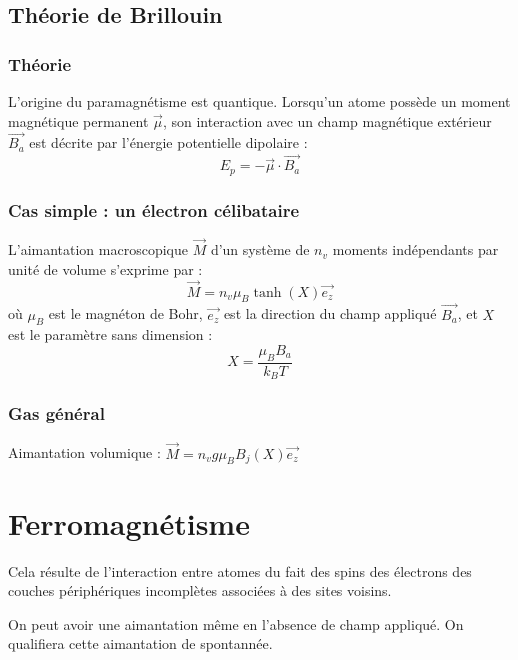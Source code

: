 \documentclass[french]{yLectureNote}
\renewcommand{\vec}{\overrightarrow}
\begin{document}
\subsection{Théorie de Brillouin}

\subsubsection{Théorie}

L'origine du paramagnétisme est quantique. Lorsqu'un atome possède un moment magnétique permanent $\vec{\mu}$, son interaction avec un champ magnétique extérieur $\vec{B_a}$ est décrite par l'énergie potentielle dipolaire :
$$E_p = -\vec{\mu} \cdot \vec{B_a}$$
\subsubsection{Cas simple : un électron célibataire}

\begin{proposition}
L'aimantation macroscopique $\vec{M}$ d'un système de $n_v$ moments indépendants par unité de volume s'exprime par :
$$\vec{M} = n_v \mu_B \tanh(X)\vec{e_z}$$
où $\mu_B$ est le magnéton de Bohr, $\vec{e_z}$ est la direction du champ appliqué $\vec{B_a}$, et $X$ est le paramètre sans dimension :
$$X = \frac{\mu_B B_a}{k_B T}$$
\end{proposition}


\subsubsection{Gas général}
\begin{definition}
    Aimantation volumique : $\vec{M} = n_v g\mu_B B_j(X)\vec{e_z}$

\end{definition}
\section{Ferromagnétisme}
\begin{definition}
    Cela résulte de l'interaction entre atomes du fait des spins des électrons des couches périphériques incomplètes associées à des
sites voisins.

On peut avoir une aimantation même en l'absence de champ appliqué. On qualifiera cette aimantation de spontannée.
\end{definition}

\end{document}
